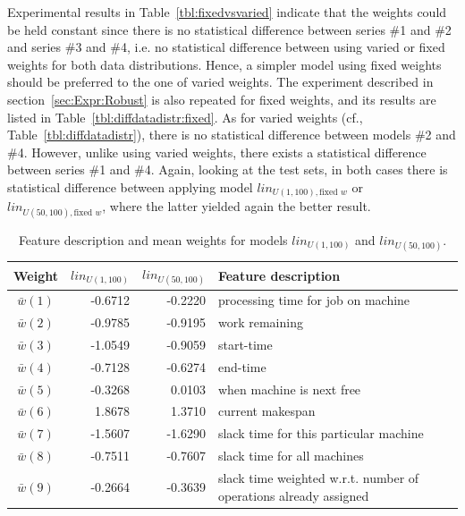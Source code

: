 \documentclass[10pt]{llncs}
\begin{document}
Experimental results in Table~\ref{tbl:fixedvsvaried} indicate that the weights could be held constant since there is no statistical difference between series \#1 and \#2 and series \#3 and \#4, i.e. no statistical difference between using varied or fixed weights for both data distributions. Hence, a simpler model using fixed weights should be preferred to the one of varied weights. The experiment described in section~\ref{sec:Expr:Robust} is also repeated for fixed weights, and its results are listed in Table~\ref{tbl:diffdatadistr:fixed}. As for varied weights (cf., Table~\ref{tbl:diffdatadistr}), there is no statistical difference between models \#2 and \#4. However, unlike using varied weights, there exists a statistical difference between series \#1 and \#4. Again, looking at the test sets, in both cases there is statistical difference between applying model $lin_{U(1,100),\textrm{fixed }w}$ or $lin_{U(50,100),\textrm{fixed }w}$, where the latter yielded again the better result.

\begin{table}[t!]
 {\footnotesize
 \begin{center}
  \begin{tabular}{|c|r|r|p{5.5cm}|}
   \hline\hline
  Weight & $lin_{U(1,100)}$ & $lin_{U(50,100)}$ & Feature description \\ \hline
  $\bar{w}(1)$ & -0.6712  & -0.2220 & processing time for job on machine\\
  $\bar{w}(2)$ & -0.9785  & -0.9195 & work remaining \\
  $\bar{w}(3)$ & -1.0549  & -0.9059 & start-time \\
  $\bar{w}(4)$ & -0.7128  & -0.6274 & end-time \\
  $\bar{w}(5)$ & -0.3268  &  0.0103 & when machine is next free \\
  $\bar{w}(6)$ &  1.8678  &  1.3710 & current makespan \\
  $\bar{w}(7)$ & -1.5607  & -1.6290 & slack time for this particular machine \\
  $\bar{w}(8)$ & -0.7511  & -0.7607 & slack time for all machines \\
  $\bar{w}(9)$ & -0.2664  & -0.3639 & slack time weighted w.r.t. number of operations already assigned \\
   \hline\hline
  \end{tabular}
 \end{center}}
 \caption{Feature description and mean weights for models $lin_{U(1,100)}$ and $lin_{U(50,100)}$.}
 \label{tbl:features}
\end{table}
\end{document}
